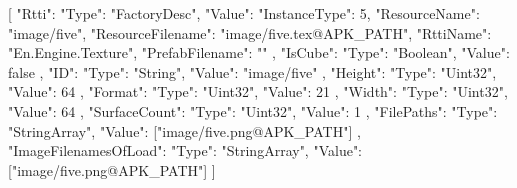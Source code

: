 [{
        "Rtti": {
            "Type": "FactoryDesc",
            "Value": {
                "InstanceType": 5,
                "ResourceName": "image/five",
                "ResourceFilename": "image/five.tex@APK_PATH",
                "RttiName": "En.Engine.Texture",
                "PrefabFilename": ""
            }
        },
        "IsCube": {
            "Type": "Boolean",
            "Value": false
        },
        "ID": {
            "Type": "String",
            "Value": "image/five"
        },
        "Height": {
            "Type": "Uint32",
            "Value": 64
        },
        "Format": {
            "Type": "Uint32",
            "Value": 21
        },
        "Width": {
            "Type": "Uint32",
            "Value": 64
        },
        "SurfaceCount": {
            "Type": "Uint32",
            "Value": 1
        },
        "FilePaths": {
            "Type": "StringArray",
            "Value": ["image/five.png@APK_PATH"]
        },
        "ImageFilenamesOfLoad": {
            "Type": "StringArray",
            "Value": ["image/five.png@APK_PATH"]
        }
    }]